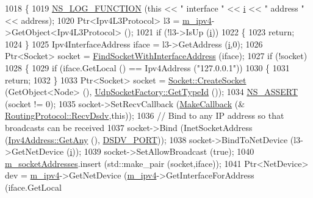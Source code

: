 \begin{DoxyCode}
1018 \{
1019   \hyperlink{log-macros-disabled_8h_a90b90d5bad1f39cb1b64923ea94c0761}{NS\_LOG\_FUNCTION} (\textcolor{keyword}{this} << \textcolor{stringliteral}{" interface "} << \hyperlink{bernuolliDistribution_8m_a6f6ccfcf58b31cb6412107d9d5281426}{i} << \textcolor{stringliteral}{" address "} << address);
1020   Ptr<Ipv4L3Protocol> l3 = \hyperlink{classns3_1_1dsdv_1_1RoutingProtocol_a955477c7f38e64762a264c24e3762af6}{m\_ipv4}->GetObject<Ipv4L3Protocol> ();
1021   \textcolor{keywordflow}{if} (!l3->IsUp (\hyperlink{bernuolliDistribution_8m_a6f6ccfcf58b31cb6412107d9d5281426}{i}))
1022     \{
1023       \textcolor{keywordflow}{return};
1024     \}
1025   Ipv4InterfaceAddress iface = l3->GetAddress (\hyperlink{bernuolliDistribution_8m_a6f6ccfcf58b31cb6412107d9d5281426}{i},0);
1026   Ptr<Socket> socket = \hyperlink{classns3_1_1dsdv_1_1RoutingProtocol_ab87d72bcdb89e0ff1034912db8868c01}{FindSocketWithInterfaceAddress} (iface);
1027   \textcolor{keywordflow}{if} (!socket)
1028     \{
1029       \textcolor{keywordflow}{if} (iface.GetLocal () == Ipv4Address (\textcolor{stringliteral}{"127.0.0.1"}))
1030         \{
1031           \textcolor{keywordflow}{return};
1032         \}
1033       Ptr<Socket> socket = \hyperlink{classns3_1_1Socket_ad448a62bb50ad3dbac59c879a885a8d2}{Socket::CreateSocket} (GetObject<Node> (),
      \hyperlink{classns3_1_1UdpSocketFactory_ad5b47e944de8861e3dc2b6de1ccbdf5b}{UdpSocketFactory::GetTypeId} ());
1034       \hyperlink{assert_8h_a6dccdb0de9b252f60088ce281c49d052}{NS\_ASSERT} (socket != 0);
1035       socket->SetRecvCallback (\hyperlink{group__makecallbackmemptr_ga9376283685aa99d204048d6a4b7610a4}{MakeCallback} (&
      \hyperlink{classns3_1_1dsdv_1_1RoutingProtocol_ad27475d64bfd478b57d73f3cc08d4c99}{RoutingProtocol::RecvDsdv},\textcolor{keyword}{this}));
1036       \textcolor{comment}{// Bind to any IP address so that broadcasts can be received}
1037       socket->Bind (InetSocketAddress (\hyperlink{classns3_1_1Ipv4Address_a7a39b330c8e701183a411d5779fca1a4}{Ipv4Address::GetAny} (), 
      \hyperlink{classns3_1_1dsdv_1_1RoutingProtocol_a14b063286a3c34efb9537f6456af3271}{DSDV\_PORT}));
1038       socket->BindToNetDevice (l3->GetNetDevice (\hyperlink{bernuolliDistribution_8m_a6f6ccfcf58b31cb6412107d9d5281426}{i}));
1039       socket->SetAllowBroadcast (\textcolor{keyword}{true});
1040       \hyperlink{classns3_1_1dsdv_1_1RoutingProtocol_a9f3be507604655079b145f063cf036fd}{m\_socketAddresses}.insert (std::make\_pair (socket,iface));
1041       Ptr<NetDevice> dev = \hyperlink{classns3_1_1dsdv_1_1RoutingProtocol_a955477c7f38e64762a264c24e3762af6}{m\_ipv4}->GetNetDevice (\hyperlink{classns3_1_1dsdv_1_1RoutingProtocol_a955477c7f38e64762a264c24e3762af6}{m\_ipv4}->GetInterfaceForAddress (iface.GetLocal

\end{DoxyCode}
